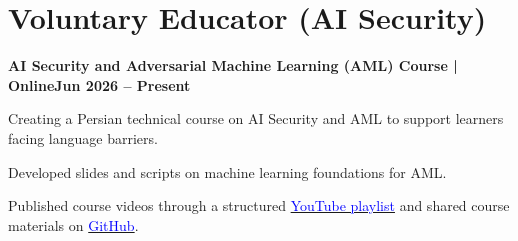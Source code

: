 \documentclass[letterpaper,10pt]{article}
\newcommand{\heading}[2]{
  \hspace{10pt}#1\hfill#2\\
}
\newcommand{\headingBf}[2]{
  \heading{\textbf{#1}}{\textbf{#2}}
}
\newenvironment{resume_list}{
  \vspace{-7pt}
  \begin{itemize}[itemsep=-2px, parsep=1pt, leftmargin=30pt]
}{
  \end{itemize}
}
\begin{document}



\section{Voluntary Educator (AI Security)}

\headingBf{AI Security and Adversarial Machine Learning (AML) Course | Online}{Jun 2026 -- Present}
\begin{resume_list}
    \item Creating a Persian technical course on AI Security and AML to support learners facing language barriers.
    \item Developed slides and scripts on machine learning foundations for AML.
    \item Published course videos through a structured \href{https://youtube.com/playlist?list=PLYxTF848CZLmN1wPNhX5gKc4g4DSRafZE&si=mGru-L7j3YX1JNZC}{\textcolor{blue}{YouTube playlist}} and shared course materials on \href{https://github.com/arashVsh/AML_Course_Persian}{\textcolor{blue}{GitHub}}.
\end{resume_list}
\end{document}
